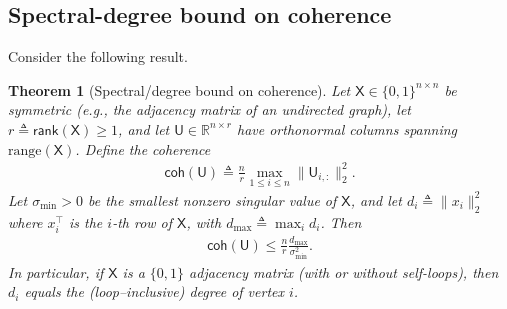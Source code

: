 \documentclass[12pt]{article}
\newtheorem{theorem}{Theorem}
\newcommand{\s}[1]{\mathsf{#1}}
\begin{document}
\subsection{Spectral-degree bound on coherence}
Consider the following result.
\begin{theorem}[Spectral/degree bound on coherence]
Let $\s{X}\in\{0,1\}^{n\times n}$ be symmetric (e.g., the adjacency matrix of an undirected graph),
let $r\triangleq\s{rank}(\s{X})\geq  1$, and let $\s{U}\in\mathbb{R}^{n\times r}$ have orthonormal columns spanning $\mathrm{range}(\s{X})$. Define the coherence
\begin{align}
\s{coh}(\s{U})\triangleq\frac{n}{r}\max_{1\leq  i\leq  n}\|\s{U}_{i,:}\|_2^2.
\end{align}
Let $\sigma_{\min}>0$ be the smallest nonzero singular value of $\s{X}$, and let
$d_i\triangleq\|x_i\|_2^2$ where $x_i^\top$ is the $i$-th row of $\s{X}$, with $d_{\max}\triangleq\max_i d_i$.
Then
\begin{align}
\s{coh}(\s{U})\leq\frac{n}{r}\frac{d_{\max}}{\sigma_{\min}^2}.
\end{align}
In particular, if $\s{X}$ is a $\{0,1\}$ adjacency matrix (with or without self-loops), then $d_i$ equals the (loop–inclusive) degree of vertex $i$.
\end{theorem}
\end{document}

